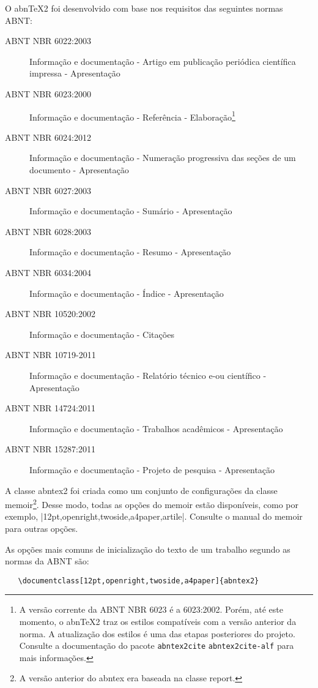 O abnTeX2 foi desenvolvido com base nos requisitos das seguintes normas ABNT:

\begin{description}
  \item[ABNT NBR 6022:2003] Informação e documentação - Artigo em publicação
  periódica científica impressa - Apresentação
  \item[ABNT NBR 6023:2000] Informação e documentação - Referência -
  Elaboração\footnote{A versão corrente da ABNT NBR 6023 é a 6023:2002. Porém,
  até este momento, o abnTeX2 traz os estilos compatíveis com a versão
  anterior da norma. A atualização dos estilos é uma das etapas posteriores do
  projeto. Consulte a documentação do pacote \texttt{abntex2cite} \texttt{abntex2cite-alf}
  para mais informações.}
  \item[ABNT NBR 6024:2012] Informação e documentação - Numeração
  progressiva das seções de um documento - Apresentação
  \item[ABNT NBR 6027:2003] Informação e documentação - Sumário -
  Apresentação
  \item[ABNT NBR 6028:2003] Informação e documentação - Resumo -
  Apresentação
  \item[ABNT NBR 6034:2004] Informação e documentação - Índice -
  Apresentação
  \item[ABNT NBR 10520:2002] Informação e documentação - Citações
  \item[ABNT NBR 10719-2011] Informação e documentação - Relatório técnico
  e-ou científico - Apresentação
  \item[ABNT NBR 14724:2011] Informação e documentação - Trabalhos
  acadêmicos - Apresentação
  \item[ABNT NBR 15287:2011] Informação e documentação - Projeto de pesquisa -
  Apresentação
\end{description}

A classe \textsf{abntex2} foi criada como um conjunto de configurações da classe
\textsf{memoir}\footnote{A versão anterior do abntex era baseada na
classe \textsf{report}.}. Desse modo, todas as opções do \textsf{memoir} estão
disponíveis, como por exemplo, |12pt,openright,twoside,a4paper,artile|. Consulte
o manual do \textsf{memoir} para outras opções.

As opções mais comuns de inicialização do texto de um trabalho segundo as normas da ABNT são:

\begin{verbatim}
   \documentclass[12pt,openright,twoside,a4paper]{abntex2}
\end{verbatim}

